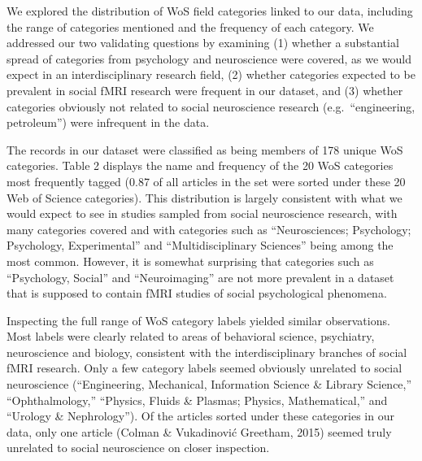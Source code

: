 \documentclass[
  english,
  man,floatsintext]{apa6}
\begin{document}
We explored the distribution of WoS field categories linked to our data, including the range of categories mentioned and the frequency of each category. We addressed our two validating questions by examining (1) whether a substantial spread of categories from psychology and neuroscience were covered, as we would expect in an interdisciplinary research field, (2) whether categories expected to be prevalent in social fMRI research were frequent in our dataset, and (3) whether categories obviously not related to social neuroscience research (e.g.~``engineering, petroleum'') were infrequent in the data.

The records in our dataset were classified as being members of 178 unique WoS categories. Table 2 displays the name and frequency of the 20 WoS categories most frequently tagged (0.87 of all articles in the set were sorted under these 20 Web of Science categories). This distribution is largely consistent with what we would expect to see in studies sampled from social neuroscience research, with many categories covered and with categories such as ``Neurosciences; Psychology; Psychology, Experimental'' and ``Multidisciplinary Sciences'' being among the most common. However, it is somewhat surprising that categories such as ``Psychology, Social'' and ``Neuroimaging'' are not more prevalent in a dataset that is supposed to contain fMRI studies of social psychological phenomena.

Inspecting the full range of WoS category labels yielded similar observations. Most labels were clearly related to areas of behavioral science, psychiatry, neuroscience and biology, consistent with the interdisciplinary branches of social fMRI research. Only a few category labels seemed obviously unrelated to social neuroscience (``Engineering, Mechanical, Information Science \& Library Science,'' ``Ophthalmology,'' ``Physics, Fluids \& Plasmas; Physics, Mathematical,'' and ``Urology \& Nephrology''). Of the articles sorted under these categories in our data, only one article (Colman \& Vukadinović Greetham, 2015) seemed truly unrelated to social neuroscience on closer inspection.
\end{document}
